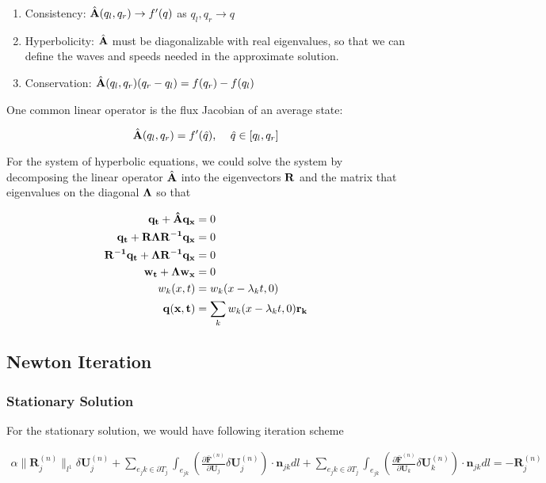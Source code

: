\documentclass[11pt]{diazessay} %
\begin{document}
\begin{enumerate}

\item Consistency: $\hat{\bf{A}}(q_l, q_r) \rightarrow f'(q)$ as $q_l, q_r \rightarrow q$
\item Hyperbolicity: $\hat{\bf{A}}$ must be diagonalizable with real eigenvalues, so that we can define the waves and speeds needed in the approximate solution.
\item Conservation: $\hat{\bf{A}}(q_l, q_r)(q_r-q_l) = f(q_r) - f(q_l)$
\end{enumerate}


One common linear operator is the flux Jacobian of an average state:

\begin{equation}
    \hat{\bf{A}}(q_l, q_r) = f'(\hat{q})\text{, }\quad \hat{q}\in[q_l, q_r]
\end{equation}

For the system of hyperbolic equations, we could solve the system by decomposing the linear operator $\hat{\bf{A}}$ into the eigenvectors $\bf{R}$ and the matrix that eigenvalues on the diagonal $\bf{\Lambda}$ so that

$$
\begin{aligned}
    \bf{q}_t + \hat{\bf{A}} \bf{q}_x  &= 0\\
    \bf{q}_t + \bf{R}\Lambda\bf{R}^{-1}\bf{q}_x & = 0\\
    \bf{R}^{-1}\bf{q}_t + \Lambda\bf{R}^{-1}\bf{q}_x & = 0\\
    \bf{w}_t + \Lambda\bf{w}_x & = 0\\
    w_k(x, t) & = w_k(x-\lambda_k t, 0)\\
    \bf{q}(x, t) & = \sum_k w_k(x-\lambda_k t, 0) \bf{r_k}
\end{aligned}
$$


\subsection{Newton Iteration}
\subsubsection{Stationary Solution}

For the stationary solution, we would have following iteration scheme \cite{li_multigrid_nodate}

$$
\begin{aligned}
    \alpha \|\textbf{R}_j^{(n)}\|_{l^1} \delta \textbf{U}_j^{(n)} 
    + \sum_{e_jk \in \partial T_j} \int_{e_{jk}} \left(\frac{\partial \bar{\textbf{F}}^{(n)}}{\partial \textbf{U}_j} \delta \textbf{U}_j^{(n)}\right) \cdot \textbf{n}_{jk} dl 
    + \sum_{e_jk \in \partial T_j} \int_{e_{jk}} \left(\frac{\partial \bar{\textbf{F}}^{(n)}}{\partial \textbf{U}_k} \delta \textbf{U}_k^{(n)}\right) \cdot \textbf{n}_{jk} dl 
    = -\textbf{R}_j^{(n)}
\end{aligned}
$$
\end{document}
